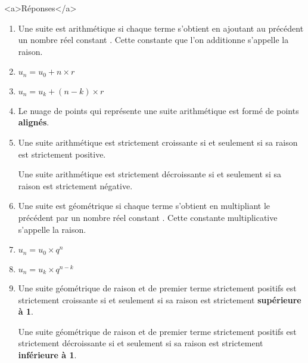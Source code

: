 \begin{corrige}
     \begin{h2}<a>Réponses</a>\end{h2}
     \begin{enumerate}
          \item
          Une suite est arithmétique si chaque terme s'obtient en ajoutant au précédent un nombre réel constant . Cette constante que l'on additionne s'appelle la raison.
          \item
          $u_{n}=u_{0}+n\times r$
          \item
          $u_{n}=u_{k}+\left(n-k\right)\times r$
          \item
          Le nuage de points qui représente une suite arithmétique est formé de points \textbf{alignés}.
          \item
          Une suite arithmétique est strictement croissante si et seulement si sa raison est strictement positive.
          \par
          Une suite arithmétique est strictement décroissante si et seulement si sa raison est strictement négative.
          \item
          Une suite est  géométrique si chaque terme s'obtient en multipliant le précédent par un nombre réel constant . Cette constante multiplicative s'appelle la raison.
          \item
          $u_{n}=u_{0}\times q^{n}$
          \item
          $u_{n}=u_{k}\times q^{n-k}$
          \item
          Une suite géométrique de raison et de premier terme strictement positifs est strictement croissante si et seulement si sa raison est strictement \textbf{supérieure à 1}.
          \par
          Une suite géométrique de raison et de premier terme strictement positifs est strictement décroissante si et seulement si sa raison est strictement \textbf{inférieure à 1}.
     \end{enumerate}
\end{corrige}
